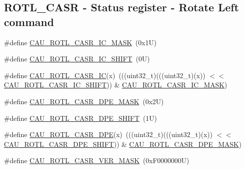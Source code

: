 \subsection*{R\+O\+T\+L\+\_\+\+C\+A\+SR -\/ Status register -\/ Rotate Left command}
\begin{DoxyCompactItemize}
\item 
\#define \mbox{\hyperlink{group___c_a_u___register___masks_ga872c60c9f23d4d48a0f47cd1f3848540}{C\+A\+U\+\_\+\+R\+O\+T\+L\+\_\+\+C\+A\+S\+R\+\_\+\+I\+C\+\_\+\+M\+A\+SK}}~(0x1\+U)
\item 
\#define \mbox{\hyperlink{group___c_a_u___register___masks_gafe14ff3ce4f7d2b10d0b202cf03546af}{C\+A\+U\+\_\+\+R\+O\+T\+L\+\_\+\+C\+A\+S\+R\+\_\+\+I\+C\+\_\+\+S\+H\+I\+FT}}~(0\+U)
\item 
\#define \mbox{\hyperlink{group___c_a_u___register___masks_gad7db402248445472335351e6f94cce74}{C\+A\+U\+\_\+\+R\+O\+T\+L\+\_\+\+C\+A\+S\+R\+\_\+\+IC}}(x)~(((uint32\+\_\+t)(((uint32\+\_\+t)(x)) $<$$<$ \mbox{\hyperlink{group___c_a_u___register___masks_gafe14ff3ce4f7d2b10d0b202cf03546af}{C\+A\+U\+\_\+\+R\+O\+T\+L\+\_\+\+C\+A\+S\+R\+\_\+\+I\+C\+\_\+\+S\+H\+I\+FT}})) \& \mbox{\hyperlink{group___c_a_u___register___masks_ga872c60c9f23d4d48a0f47cd1f3848540}{C\+A\+U\+\_\+\+R\+O\+T\+L\+\_\+\+C\+A\+S\+R\+\_\+\+I\+C\+\_\+\+M\+A\+SK}})
\item 
\#define \mbox{\hyperlink{group___c_a_u___register___masks_ga834d584c25afb7faf4c9f0b87b5b9619}{C\+A\+U\+\_\+\+R\+O\+T\+L\+\_\+\+C\+A\+S\+R\+\_\+\+D\+P\+E\+\_\+\+M\+A\+SK}}~(0x2\+U)
\item 
\#define \mbox{\hyperlink{group___c_a_u___register___masks_ga4d0da6b7c4575317872d875392fb0272}{C\+A\+U\+\_\+\+R\+O\+T\+L\+\_\+\+C\+A\+S\+R\+\_\+\+D\+P\+E\+\_\+\+S\+H\+I\+FT}}~(1\+U)
\item 
\#define \mbox{\hyperlink{group___c_a_u___register___masks_ga3be1f7ca7cf9ef4126981edef255fd08}{C\+A\+U\+\_\+\+R\+O\+T\+L\+\_\+\+C\+A\+S\+R\+\_\+\+D\+PE}}(x)~(((uint32\+\_\+t)(((uint32\+\_\+t)(x)) $<$$<$ \mbox{\hyperlink{group___c_a_u___register___masks_ga4d0da6b7c4575317872d875392fb0272}{C\+A\+U\+\_\+\+R\+O\+T\+L\+\_\+\+C\+A\+S\+R\+\_\+\+D\+P\+E\+\_\+\+S\+H\+I\+FT}})) \& \mbox{\hyperlink{group___c_a_u___register___masks_ga834d584c25afb7faf4c9f0b87b5b9619}{C\+A\+U\+\_\+\+R\+O\+T\+L\+\_\+\+C\+A\+S\+R\+\_\+\+D\+P\+E\+\_\+\+M\+A\+SK}})
\item 
\#define \mbox{\hyperlink{group___c_a_u___register___masks_ga6d8f0ea43478a075cf2a0c9745bd211c}{C\+A\+U\+\_\+\+R\+O\+T\+L\+\_\+\+C\+A\+S\+R\+\_\+\+V\+E\+R\+\_\+\+M\+A\+SK}}~(0x\+F0000000\+U)

\end{DoxyCompactItemize}
